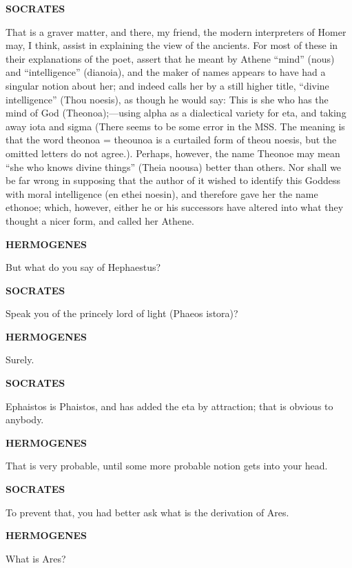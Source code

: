 \documentclass[11pt,letter]{article}
\begin{document}
\par \textbf{SOCRATES}
\par   That is a graver matter, and there, my friend, the modern interpreters of Homer may, I think, assist in explaining the view of the ancients. For most of these in their explanations of the poet, assert that he meant by Athene “mind” (nous) and “intelligence” (dianoia), and the maker of names appears to have had a singular notion about her; and indeed calls her by a still higher title, “divine intelligence” (Thou noesis), as though he would say:  This is she who has the mind of God (Theonoa);—using alpha as a dialectical variety for eta, and taking away iota and sigma (There seems to be some error in the MSS. The meaning is that the word theonoa = theounoa is a curtailed form of theou noesis, but the omitted letters do not agree.). Perhaps, however, the name Theonoe may mean “she who knows divine things” (Theia noousa) better than others. Nor shall we be far wrong in supposing that the author of it wished to identify this Goddess with moral intelligence (en ethei noesin), and therefore gave her the name ethonoe; which, however, either he or his successors have altered into what they thought a nicer form, and called her Athene.

\par \textbf{HERMOGENES}
\par   But what do you say of Hephaestus?

\par \textbf{SOCRATES}
\par   Speak you of the princely lord of light (Phaeos istora)?

\par \textbf{HERMOGENES}
\par   Surely.

\par \textbf{SOCRATES}
\par   Ephaistos is Phaistos, and has added the eta by attraction; that is obvious to anybody.

\par \textbf{HERMOGENES}
\par   That is very probable, until some more probable notion gets into your head.

\par \textbf{SOCRATES}
\par   To prevent that, you had better ask what is the derivation of Ares.

\par \textbf{HERMOGENES}
\par   What is Ares?
\end{document}
